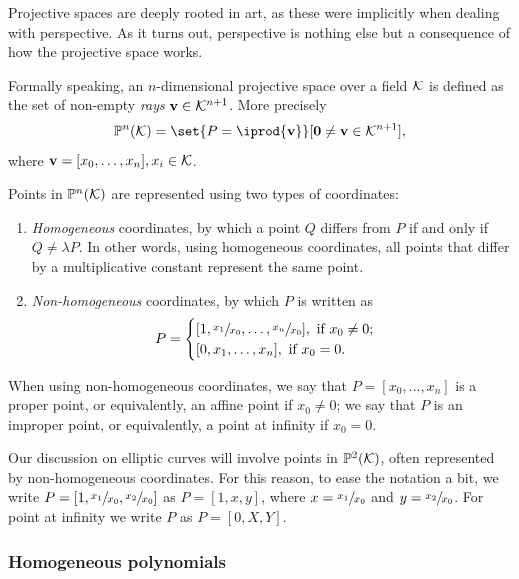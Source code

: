 \documentclass{subfiles}
\begin{document}
    Projective spaces are deeply rooted in art,
        as these were implicitly when dealing with perspective.
        As it turns out,
        perspective is nothing else but a consequence of how the projective space works.

    Formally speaking, an \(n\)-dimensional projective space over a field \(\mathcal{K}\) is defined 
        as the set of non-empty \emph{rays} \(\mathbf{v} \in \mathcal{K}^{n + 1}\).
        More precisely 
        \[
            \mathbb{P}^{n}(\K) = \set{P = \iprod{\mathbf{v}}}[\mathbf{0} \ne \mathbf{v}  \in \K^{n + 1}],
        \]
        where \(\mathbf{v} = [x_{0}, \ldots, x_{n}], x_{i} \in \mathcal{K}\).

    Points in \(\mathbb{P}^{n}(\mathcal{K})\) are represented using two types of coordinates:
        \begin{enumerate}
            \item \emph{Homogeneous} coordinates, by which a point \(Q\) differs from \(P\)
                if and only if \(Q \ne \lambda P\). In other words,
                using homogeneous coordinates,
                all points that differ by a multiplicative constant represent the same point.

            \item \emph{Non-homogeneous} coordinates, by which \(P\) is written as 
                \[ P = \begin{cases}
                    [1, \sfrac{x_{1}}{x_{0}}, \ldots, \sfrac{x_{n}}{x_{0}}], \text{ if } x_{0} \ne 0; \\
                    [0, x_{1}, \ldots, x_{n}], \text{ if } x_{0} = 0.
                \end{cases}\]
        \end{enumerate}
        When using non-homogeneous coordinates, 
        we say that \(P = [x_{0}, \ldots, x_{n}]\) is a proper point, or equivalently,
        an affine point if \(x_{0} \ne 0\); we say that \(P\) is an improper point,
        or equivalently, a point at infinity if \(x_{0} = 0\).

    Our discussion on elliptic curves will involve points in \(\mathbb{P}^{2}(\mathcal{K})\),
        often represented by non-homogeneous coordinates.
        For this reason, to ease the notation a bit, 
        we write \(P = [1, \sfrac{x_{1}}{x_{0}}, \sfrac{x_{2}}{x_{0}}]\) as
        \(P = [1, x, y]\), where \(x = \sfrac{x_{1}}{x_{0}}\) and \(y = \sfrac{x_{2}}{x_{0}}\).
        For point at infinity we write \(P\) as \(P = [0, X, Y]\).

    \subsubsection{Homogeneous polynomials}
    
        
\end{document}
